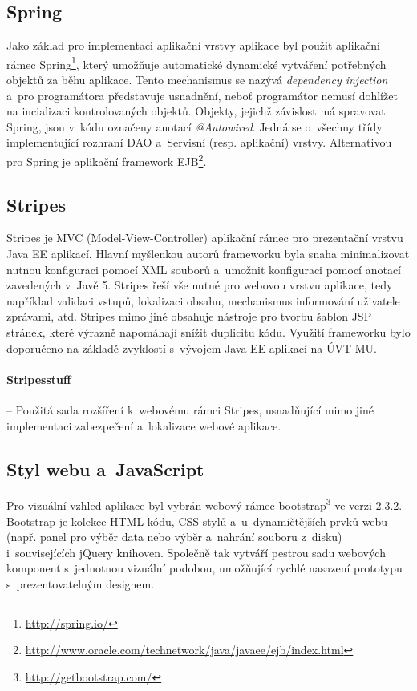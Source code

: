 \documentclass[11pt, final, oneside]{fithesis2}
\begin{document}
\subsection{Spring}
Jako základ pro implementaci aplikační vrstvy aplikace byl použit aplikační rámec Spring\footnote{\url{http://spring.io/}}, který umožňuje automatické dynamické vytváření potřebných objektů za běhu aplikace. Tento mechanismus se nazývá \textit{dependency injection} a~pro programátora představuje usnadnění, neboť programátor nemusí dohlížet na incializaci kontrolovaných objektů. Objekty, jejichž závislost má spravovat Spring, jsou v~kódu označeny anotací \textit{@Autowired}. Jedná se o~všechny třídy implementující rozhraní DAO a~Servisní (resp. aplikační) vrstvy.
Alternativou pro Spring je aplikační framework EJB\footnote{\url{http://www.oracle.com/technetwork/java/javaee/ejb/index.html}}.

\subsection{Stripes}
Stripes je MVC (Model-View-Controller) aplikační rámec pro prezentační vrstvu Java EE aplikací. Hlavní myšlenkou autorů frameworku byla snaha minimalizovat nutnou konfiguraci pomocí XML souborů a~umožnit konfiguraci pomocí anotací zavedených v~Javě 5. Stripes řeší vše nutné pro webovou vrstvu aplikace, tedy například validaci vstupů, lokalizaci obsahu, mechanismus informování uživatele zprávami, atd. Stripes mimo jiné obsahuje nástroje pro tvorbu šablon JSP stránek, které výrazně napomáhají snížit duplicitu kódu.
Využití frameworku bylo doporučeno na základě zvyklostí s~vývojem Java EE aplikací na ÚVT MU.

\paragraph*{Stripesstuff} -- Použitá sada rozšíření k~webovému rámci Stripes, usnadňující mimo jiné implementaci zabezpečení a~lokalizace webové aplikace. 

\subsection{Styl webu a~JavaScript}
Pro vizuální vzhled aplikace byl vybrán webový rámec bootstrap\footnote{\url{http://getbootstrap.com/}} ve verzi 2.3.2. Bootstrap je kolekce HTML kódu, CSS stylů a~u~dynamičtějších prvků webu (např. panel pro výběr data nebo výběr a~nahrání souboru z~disku) i~souvisejících jQuery knihoven. Společně tak vytváří pestrou sadu webových komponent s~jednotnou vizuální podobou, umožňující rychlé nasazení prototypu s~prezentovatelným designem. 
\end{document}
